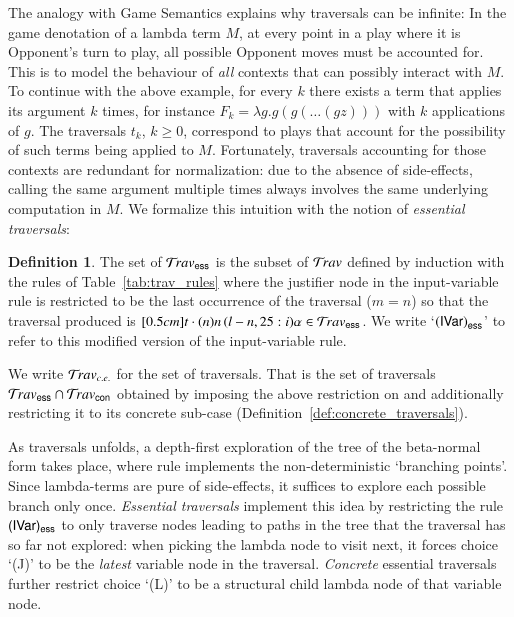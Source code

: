 \documentclass{elsarticle}
\theoremstyle{plain}
\theoremstyle{definition}
\newtheorem{definition}{Definition}[section]
\newcommand\Nodes{\mathcal{N}}%
\newcommand\NodesVar{\Nodes_{\sf var}}%
\newcommand{\essential}{{\sf ess}}
\newcommand{\concrete}{{\sf con}}
\newcommand{\travsetes}{{\travset_\essential}} %
\newcommand{\travsetcon}{{\travset_\concrete}} %
\newcommand{\travsetcones}{\travset_{c.e.}} %
\newcommand{\travulc}{\travset}
\newcommand{\rulefont}[1]{\mathbf{\sf #1}}
\newcommand{\enables}{\vdash} %
\newcommand{\ExternalNodes}{\Nodes^{\sf ext}}
\begin{document}
The analogy with Game Semantics explains why traversals can be infinite: In the game denotation of a lambda term $M$, at every point in a play where it is Opponent's turn to play, all possible Opponent moves must be accounted for.
This is to model the behaviour of \emph{all} contexts that can possibly interact with $M$. To continue with the above example, for every $k$ there exists a term that applies its argument $k$ times, for instance $F_k = \lambda g . g (g ( \ldots (g z)))$ with $k$ applications of $g$.
The traversals $t_k$, $k\geq 0$, correspond to plays
 that account for the possibility of
 such terms being applied to $M$. Fortunately, traversals accounting for those contexts are redundant for normalization: due to the absence of side-effects, calling the same argument multiple times always involves the same underlying computation in $M$. We formalize this intuition with the notion of \emph{essential traversals}:

\begin{definition}
\label{dfn:essential_traversals}
The set of  $\travsetes$ is the subset of $\travulc$ defined by induction with the rules of Table~\ref{tab:trav_rules} where the justifier node in the
input-variable rule  is restricted to be the last occurrence of the traversal ($m=n$) so that the traversal produced is $\Pstr[0.5cm]{t \cdot (n){n} \, (l-n,25:i){\alpha}} \in \travsetes$.
We write `${\rulename{IVar}}_\essential$' to refer to this modified
version of the input-variable rule.
%

We write $\travsetcones$ for the set of
 traversals.
That is the set of traversals $\travsetes \inter \travsetcon$ obtained by imposing the above restriction on  and additionally restricting  it to its concrete sub-case (Definition~\ref{def:concrete_traversals}).
\end{definition}

As traversals unfolds, a depth-first exploration of the tree of the beta-normal form takes place, where rule  implements the non-deterministic `branching points'. Since lambda-terms are pure of side-effects,
it suffices to explore each possible branch only once.
\emph{Essential traversals} implement this idea by restricting the rule $\rulenamet{IVar}_\essential$ to only traverse nodes leading to paths in the tree that the traversal has so far not explored: when picking the lambda node to visit next, it forces choice `(J)' to be the \emph{latest} variable node in the traversal. \emph{Concrete} essential traversals further restrict choice `(L)' to be a structural child lambda node of that variable node.
\end{document}
